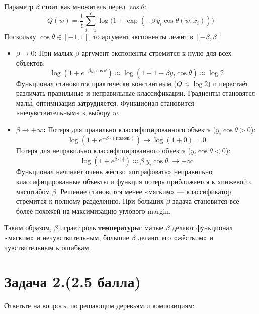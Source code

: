 \documentclass[12pt,a4paper]{article}
\begin{document}
Параметр $\beta$ стоит как множитель перед $\cos\theta$:
\[
Q(w) = \frac{1}{\ell}\sum_{i=1}^{\ell}
\log\bigl(1 + \exp(-\beta\, y_i\cos\theta(w,x_i))\bigr)
\]
Поскольку $\cos\theta \in [-1, 1]$, то аргумент экспоненты лежит в
$[-\beta, \beta]$\\[1mm]
\begin{itemize}
    \item \textbf{$\beta \to 0$:}
    При малых $\beta$ аргумент экспоненты стремится к нулю для всех
    объектов:
    \[
    \log(1 + e^{-\beta y_i\cos\theta}) \approx
    \log(1 + 1 - \beta y_i\cos\theta) \approx \log 2
    \]
    Функционал становится практически константным ($Q \approx \log 2$)
    и перестаёт различать правильные и неправильные классификации.
    Градиенты становятся мал\'{ы}, оптимизация затрудняется.
    Функционал становится «нечувствительным» к выбору $w$.

    \item \textbf{$\beta \to +\infty$:}
    Потеря для правильно классифицированного объекта
    ($y_i\cos\theta > 0$):
    \[
    \log(1+e^{-\beta \cdot (\text{полож.})}) \to \log(1+0) = 0
    \]
    Потеря для неправильно классифицированного объекта
    ($y_i\cos\theta < 0$):
    \[
    \log(1+e^{\beta\cdot|\cdot|}) \approx \beta |y_i\cos\theta| \to +\infty
    \]
    Функционал начинает очень жёстко «штрафовать» неправильно
    классифицированные объекты и функция потерь приближается к
    хинжевой с масштабом $\beta$. Решение становится менее
    «мягким» --- классификатор стремится к полному разделению.
    При больших $\beta$ задача становится всё более похожей на
    максимизацию углового margin.
\end{itemize}

Таким образом, $\beta$ играет роль \textbf{температуры}: малые $\beta$
делают функционал «мягким» и нечувствительным, большие $\beta$ делают
его «жёстким» и чувствительным к ошибкам.

\section*{Задача 2.(2.5 балла)}
Ответьте на вопросы по решающим деревьям и композициям:
\end{document}
